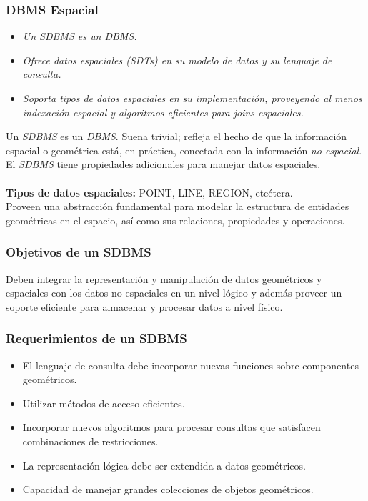 \documentclass[a4paper,12pt,oneside]{report}
\begin{document}
\subsubsection*{DBMS Espacial}
\begin{itemize}
\item \textit{Un SDBMS es un DBMS.}
\item \textit{Ofrece datos espaciales (SDTs) en su modelo de datos y su lenguaje de consulta.}
\item \textit{Soporta tipos de datos espaciales en su implementaci\'on, proveyendo al menos indexaci\'on espacial y algoritmos eficientes para joins espaciales.}
\end{itemize}
Un \textit{SDBMS} es un \textit{DBMS}. Suena trivial; refleja el hecho de que la informaci\'on espacial o geom\'etrica est\'a, en pr\'actica, conectada con la informaci\'on \textit{no-espacial}. El \textit{SDBMS} tiene propiedades adicionales para manejar datos espaciales.\\
\ \\
\textbf{Tipos de datos espaciales:} POINT, LINE, REGION, etc\'etera.\\
Proveen una abstracci\'on fundamental para modelar la estructura de entidades geom\'etricas en el espacio, as\'i como sus relaciones, propiedades y operaciones.
\subsubsection*{Objetivos de un SDBMS}
Deben integrar la representaci\'on y manipulaci\'on de datos geom\'etricos y espaciales con los datos no espaciales en un nivel l\'ogico y adem\'as proveer un soporte eficiente para almacenar y procesar datos a nivel f\'isico.
\subsubsection*{Requerimientos de un SDBMS}
\begin{itemize}
\item El lenguaje de consulta debe incorporar nuevas funciones sobre componentes geom\'etricos.
\item Utilizar m\'etodos de acceso eficientes.
\item Incorporar nuevos algoritmos para procesar consultas que satisfacen combinaciones de restricciones.
\item La representaci\'on l\'ogica debe ser extendida a datos geom\'etricos.
\item Capacidad de manejar grandes colecciones de objetos geom\'etricos.
\end{itemize}
\end{document}

